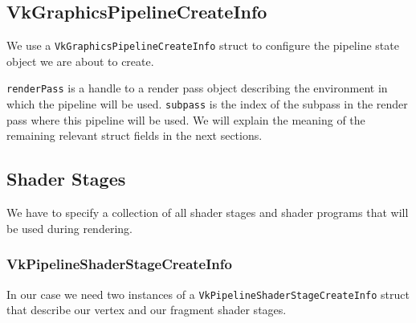 \subsection{VkGraphicsPipelineCreateInfo}

We use a \texttt{VkGraphicsPipelineCreateInfo} struct to configure the pipeline state
object we are about to create.

\begin{minipage}{\linewidth}{\noindent}
    
\end{minipage}

\texttt{renderPass} is a handle to a render pass object describing the environment
in which the pipeline will be used.
\texttt{subpass} is the index of the subpass in the render pass where
this pipeline will be used.
We will explain the meaning of the remaining relevant struct fields
in the next sections.

\subsection{Shader Stages}

We have to specify a collection of all shader stages and shader programs that
will be used during rendering.

\begin{minipage}{\linewidth}{\noindent}
    
\end{minipage}

\subsubsection{VkPipelineShaderStageCreateInfo}

In our case we need two instances of a \texttt{VkPipelineShaderStageCreateInfo}
struct that describe our vertex and our fragment shader stages.

\begin{minipage}{\linewidth}{\noindent}
    
\end{minipage}

